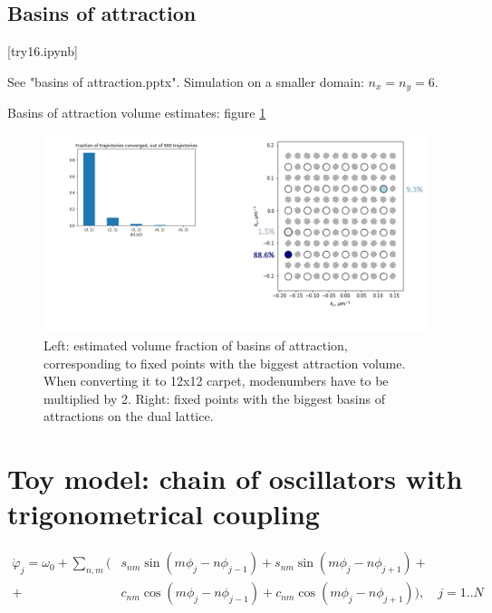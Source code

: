 \documentclass[a4paper,10pt]{article}
\begin{document}
\clearpage
\subsection{Basins of attraction}
[try16.ipynb]

See "basins of attraction.pptx". Simulation on a smaller domain: $n_x=n_y=6$.

Basins of attraction volume estimates: figure \ref{fig:basins-1}

\begin{figure}[h]
    \centering
    \includegraphics[width=.99\textwidth]{assets/theory-2019-09-18-153420477-2db.png}
    \caption{Left: estimated volume fraction of basins of attraction, corresponding to fixed points with the biggest attraction volume. When converting it to 12x12 carpet, modenumbers have to be multiplied by 2. Right: fixed points with the biggest basins of attractions on the dual lattice.}
    \label{fig:basins-1}
\end{figure}

\clearpage
\section{Toy model: chain of oscillators with trigonometrical coupling}
\newcommand*{\fr}[2]{\frac{2 \pi #1} {N} #2 } %
\newcommand*{\si}[2]{\sin  \fr{#1}{#2} } %
\newcommand*{\co}[2]{\cos \fr{#1}{#2} } 
\newcommand*{\ex}[2]{e ^{i \fr{#1}{#2}}}



\begin{align*}
\dot \varphi_j = \omega_0 + \sum_{n,m} ( & s_{nm}\sin(m\phi_j - n \phi_{j-1}) + s_{nm}\sin(m\phi_j - n \phi_{j+1}) +\\
+ & c_{nm} \cos(m\phi_j - n \phi_{j-1}) + c_{nm} \cos(m\phi_j - n \phi_{j+1}) ), \quad j=1..N
\end{align*}
\end{document}
